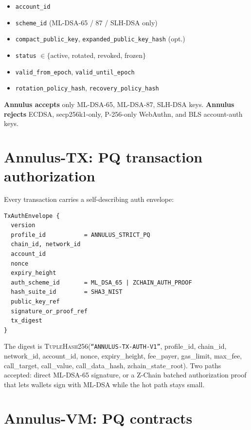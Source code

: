 \documentclass[11pt,a4paper]{article}
\begin{document}
\begin{itemize}[leftmargin=*, itemsep=0pt]
\item \texttt{account\_id}
\item \texttt{scheme\_id} (ML-DSA-65 / 87 / SLH-DSA only)
\item \texttt{compact\_public\_key}, \texttt{expanded\_public\_key\_hash} (opt.)
\item \texttt{status} $\in \{$active, rotated, revoked, frozen$\}$
\item \texttt{valid\_from\_epoch}, \texttt{valid\_until\_epoch}
\item \texttt{rotation\_policy\_hash}, \texttt{recovery\_policy\_hash}
\end{itemize}

\textbf{Annulus accepts} only ML-DSA-65, ML-DSA-87, SLH-DSA keys.
\textbf{Annulus rejects} ECDSA, secp256k1-only, P-256-only WebAuthn,
and BLS account-auth keys.

\section{Annulus-TX: PQ transaction authorization}
\label{sec:annulus-tx}

Every transaction carries a self-describing auth envelope:

\begin{verbatim}
TxAuthEnvelope {
  version
  profile_id           = ANNULUS_STRICT_PQ
  chain_id, network_id
  account_id
  nonce
  expiry_height
  auth_scheme_id       = ML_DSA_65 | ZCHAIN_AUTH_PROOF
  hash_suite_id        = SHA3_NIST
  public_key_ref
  signature_or_proof_ref
  tx_digest
}
\end{verbatim}

\noindent
The digest is \textsc{TupleHash256}(\texttt{``ANNULUS-TX-AUTH-V1''},
profile\_id, chain\_id, network\_id, account\_id, nonce,
expiry\_height, fee\_payer, gas\_limit, max\_fee, call\_target,
call\_value, call\_data\_hash, zchain\_state\_root). Two paths
accepted: direct ML-DSA-65 signature, or a Z-Chain batched
authorization proof that lets wallets sign with ML-DSA while the
hot path stays small.

\section{Annulus-VM: PQ contracts}
\label{sec:annulus-vm}
\end{document}
